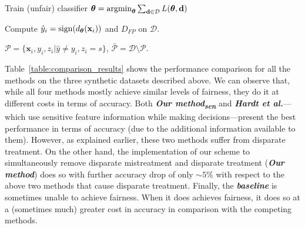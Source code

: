 \documentclass[letterpaper]{sig-alternate-2013}
\newcommand{\xhdr}[1]{\vspace{0.5mm}\noindent{{\bf #1.}}}
\begin{document}
\RestyleAlgo{}
\DontPrintSemicolon
\begin{algorithm}[t]

Train (unfair) classifier $\boldsymbol{\theta} ={\mathop{\mathrm{argmin}}}_{\boldsymbol{\theta}} \sum_{\mathbf{d} \in \mathcal{D}} L(\boldsymbol{\theta}, \mathbf{d})$

Compute $\hat{y}_i= \mathrm{sign} (d_{\boldsymbol{\theta}} (\mathbf{x}_i))$ and $D_{FP}$ on $\mathcal{D}$.

 

$\mathcal{P}= \{ \mathbf{x}_i, y_i, z_i | \hat{y}\neq y_i, z_i = s\}$, $\bar{\mathcal{P}} = \mathcal{D} \setminus \mathcal{P}$.

\caption{Baseline method for removing disparate  mistreatment on false positive rates.} \label{alg:baseline}
\vspace{-6ex}
\end{algorithm}














\xhdr{Comparison results}
Table~\ref{table:comparison_results} shows the performance comparison for all the methods on the three synthetic datasets described above.
We can observe that, while all four methods mostly achieve similar levels of fairness, they do it at different costs in terms of accuracy.
Both \textbf{\textit{Our method\textsubscript{sen}}} and \textbf{\textit{Hardt et al.}}---which use sensitive feature information while
making decisions---present the best performance in terms of accuracy (due to the additional information available to them).
However, as explained earlier, these two methods suffer from disparate treatment.
On the other hand, the implementation of our scheme to simultaneously remove disparate mistreatment and disparate treatment (\textbf{\textit{Our method}}) does so with further accuracy drop of only $\sim$$5\%$ with respect to the above two methods that cause
 disparate treatment.
Finally, the \textbf{\textit{baseline}} is sometimes unable to achieve fairness. When it does achieves fairness, it does so
at a (sometimes much) greater cost in accuracy in comparison with the competing methods.
\end{document}
